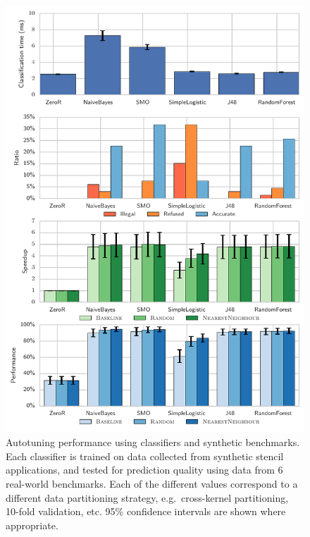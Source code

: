 \documentclass[preprint,nonatbib,10pt]{sigplanconf}
\begin{document}
\begin{figure}
\centering
\includegraphics[width=\columnwidth]{img/classification-syn-real}
\caption{%
  Autotuning performance using classifiers and synthetic benchmarks. Each
  classifier is trained on data collected from synthetic stencil
  applications, and tested for prediction quality using data from 6
  real-world benchmarks. Each of the different values correspond to a
  different data partitioning strategy, e.g.\ cross-kernel
  partitioning, 10-fold validation, etc. 95\% confidence intervals are
  shown where appropriate.%
}
\label{fig:class-syn}
\end{figure}
\end{document}

